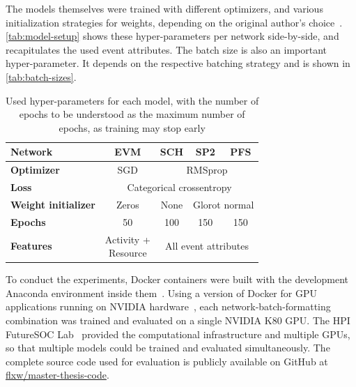 The models themselves were trained with different optimizers, and various initialization strategies for weights, depending on the original author's choice~\cite{evermann2016, schoenig2018}. \autoref{tab:model-setup} shows these hyper-parameters per network side-by-side, and recapitulates the used event attributes. The batch size is also an important hyper-parameter. It depends on the respective batching strategy and is shown in \autoref{tab:batch-sizes}.

\begin{table}[ht!]
\centering
\begin{tabular}{lcccc}
\textbf{Network}&\textbf{EVM}&\textbf{SCH}&\textbf{SP2}&\textbf{PFS}\\
\hline
\textbf{Optimizer} & SGD & \multicolumn{3}{c}{RMSprop} \\
\textbf{Loss}      &\multicolumn{4}{c}{Categorical crossentropy}\\
\textbf{Weight initializer} & Zeros & None & \multicolumn{2}{c}{Glorot normal}\\
\textbf{Epochs}    & 50 & 100 & 150 & 150\\
\textbf{Features}  & \makecell{Activity +\\Resource} & \multicolumn{3}{c}{All event attributes}\\
\end{tabular}
\caption[Used hyper-parameters for each model]{Used hyper-parameters for each model, with the number of epochs to be understood as the maximum number of epochs, as training may stop early}
\label{tab:model-setup}
\end{table}

To conduct the experiments, Docker containers were built with the development Anaconda environment inside them~\cite{web:docker}. Using a version of Docker for GPU applications running on NVIDIA hardware~\cite{web:nvidia-docker}, each network-batch-formatting combination was trained and evaluated on a single NVIDIA K80 GPU. The HPI FutureSOC Lab~\cite{web:fsoc} provided the computational infrastructure and multiple GPUs, so that multiple models could be trained and evaluated simultaneously. The complete source code used for evaluation is publicly available on GitHub at \href{https://github.com/flxw/master-thesis-code}{flxw/master-thesis-code}.

